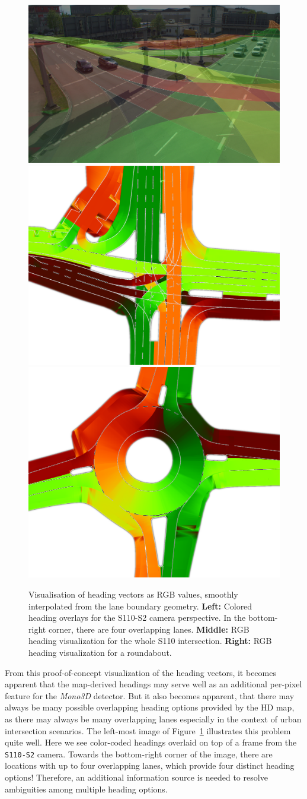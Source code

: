 \begin{figure}[htb]
    \includegraphics[width=0.4\linewidth]{figures/headings-colored-s2} %
    \includegraphics[width=0.29\linewidth]{figures/hdmap-heading-s110}
    \includegraphics[width=0.29\linewidth]{figures/hdmap-heading-roundabout} %
    \caption{Visualisation of heading vectors as RGB values, smoothly interpolated from the lane boundary geometry. \textbf{Left:} Colored heading overlays for the S110-S2 camera perspective. In the bottom-right corner, there are four overlapping lanes. \textbf{Middle:} RGB heading visualization for the whole S110 intersection. \textbf{Right:} RGB heading visualization for a roundabout.}
    \label{fig:headings-color-coded}
\end{figure}

From this proof-of-concept visualization of the heading vectors, it becomes apparent that the map-derived headings may serve well as an additional per-pixel feature for the \textit{Mono3D} detector.
But it also becomes apparent, that there may always be many possible overlapping heading options provided by the HD map, as there may always be many overlapping lanes \textemdash especially in the context of urban intersection scenarios.
The left-most image of Figure~\ref{fig:headings-color-coded} illustrates this problem quite well.
Here we see color-coded headings overlaid on top of a frame from the \texttt{S110-S2} camera.
Towards the bottom-right corner of the image, there are locations with up to four overlapping lanes, which provide four distinct heading options!
Therefore, an additional information source is needed to resolve ambiguities among multiple heading options.

